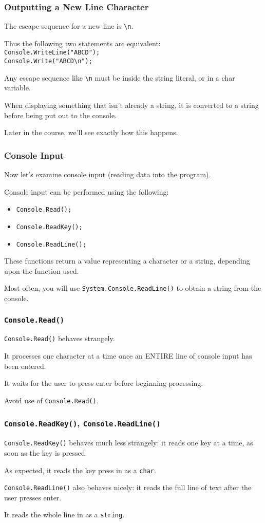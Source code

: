 \begin{frame}
\frametitle{Outputting a New Line Character}

The escape sequence for a new line is \texttt{\textbackslash n}.

Thus the following two statements are equivalent:\\
\texttt{Console.WriteLine("ABCD");}\\
\texttt{Console.Write("ABCD\textbackslash n");}

Any escape sequence like \texttt{\textbackslash n} must be inside the string literal, or in a char variable.

When displaying something that isn't already a string, it is converted to a string before being put out to the console.

Later in the course, we'll see exactly how this happens.

\end{frame}


\begin{frame}
\frametitle{Console Input}
Now let's examine console input (reading data into the program).

Console input can be performed using the following:
\begin{itemize}
	\item \texttt{Console.Read();}
	\item \texttt{Console.ReadKey();}
	\item \texttt{Console.ReadLine();}
\end{itemize}
These functions return a value representing a character or a string, depending upon the function used.

Most often, you will use \texttt{System.Console.ReadLine()} to obtain a string from the console.

\end{frame}

\begin{frame}
\frametitle{\texttt{Console.Read()}}

\texttt{Console.Read()} behaves strangely.

It processes one character at a time once an ENTIRE line of console input has been entered.

It waits for the user to press enter before beginning processing.

Avoid use of \texttt{Console.Read()}.

\end{frame}

\begin{frame}
\frametitle{\texttt{Console.ReadKey()}, \texttt{Console.ReadLine()}}
\texttt{Console.ReadKey()} behaves much less strangely: it reads one key at a time, as soon as the key is pressed.

As expected, it reads the key press in as a \texttt{char}.

\texttt{Console.ReadLine()} also behaves nicely: it reads the full line of text after the user presses enter.

It reads the whole line in as a \texttt{string}.

\end{frame}


